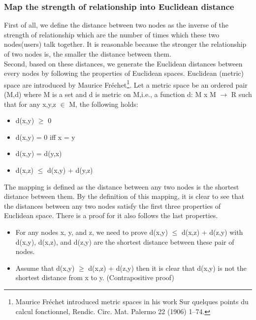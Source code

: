 \documentclass[12pt, letterpaper]{article}
\begin{document}
  \subsubsection{Map the strength of relationship into Euclidean distance}
First of all, we define the distance between two nodes as the inverse of
the strength of relationship which are the number of times which these
two nodes(users) talk together. It is reasonable because the stronger
the relationship of two nodes is, the smaller the distance between
them.
\\Second, based on these distances, we generate the Euclidean distances
between every nodes by following the properties of Euclidean
spaces. Euclidean (metric) space are introduced by Maurice Fréchet\footnote{Maurice Fréchet introduced metric spaces in his work Sur quelques points du calcul fonctionnel, Rendic. Circ. Mat. Palermo 22 (1906) 1–74.}. Let
a metric space be an ordered pair (M,d) where M is a set and d is
metric on M,i.e., a function d: M x M $\rightarrow$ R such that for any x,y,z 
$\in$ M, the following holds: 
 \begin{itemize}
    \item d(x,y) $\geq$ 0 
    \item d(x,y) = 0 iff x = y
    \item d(x,y) = d(y,x)
    \item d(x,z) $\leq$ d(x,y) + d(y,z)
  \end{itemize}
The mapping is defined as the distance between any two nodes is the
shortest distance between them. By the definition of this
mapping, it is clear to see that the distances between any two nodes
satisfy the first three properties of Euclidean space. There is a
proof for it also follows the last properties.
  \begin{itemize}
    \item For any nodes x, y, and z, we need to prove d(x,y)  $\leq$
      d(x,z) + d(z,y) with d(x,y), d(x,z), and d(z,y) are the shortest
      distance between these pair of nodes.
    \item Assume that d(x,y) $\geq$ d(x,z) + d(z,y) then it is clear
      that d(x,y) is not the shortest distance from x to
      y. (Contrapositive proof)
  \end{itemize}
\end{document}

